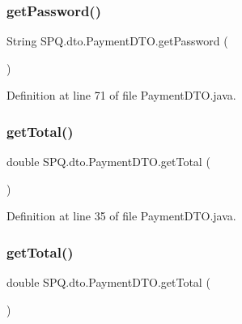 \subsubsection{\texorpdfstring{get\+Password()}{getPassword()}\hspace{0.1cm}{\footnotesize\ttfamily [3/3]}}
{\footnotesize\ttfamily String S\+P\+Q.\+dto.\+Payment\+D\+T\+O.\+get\+Password (\begin{DoxyParamCaption}{ }\end{DoxyParamCaption})}



Definition at line 71 of file Payment\+D\+T\+O.\+java.

\mbox{\label{class_s_p_q_1_1dto_1_1_payment_d_t_o_a04cd2104d07971407126fcf75ef17d5b}} 
\subsubsection{\texorpdfstring{get\+Total()}{getTotal()}\hspace{0.1cm}{\footnotesize\ttfamily [1/3]}}
{\footnotesize\ttfamily double S\+P\+Q.\+dto.\+Payment\+D\+T\+O.\+get\+Total (\begin{DoxyParamCaption}{ }\end{DoxyParamCaption})}



Definition at line 35 of file Payment\+D\+T\+O.\+java.

\mbox{\label{class_s_p_q_1_1dto_1_1_payment_d_t_o_a04cd2104d07971407126fcf75ef17d5b}} 
\subsubsection{\texorpdfstring{get\+Total()}{getTotal()}\hspace{0.1cm}{\footnotesize\ttfamily [2/3]}}
{\footnotesize\ttfamily double S\+P\+Q.\+dto.\+Payment\+D\+T\+O.\+get\+Total (\begin{DoxyParamCaption}{ }\end{DoxyParamCaption})}



